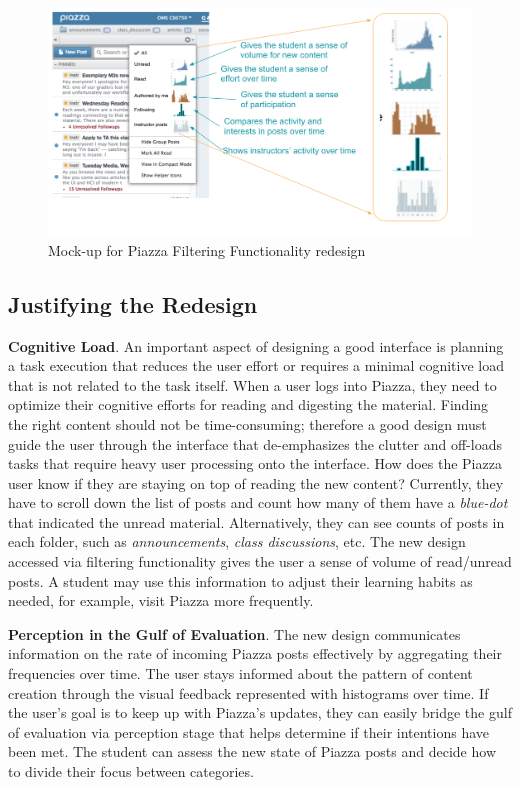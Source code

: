 \documentclass[12pt,letterpaper]{article}
\begin{document}
\begin{figure}[h]
\centering
\includegraphics[scale=.5]{figures/p5/piazza_filtering.png}
\caption{Mock-up for Piazza Filtering Functionality redesign}
\label{fig::1}
\end{figure}

\subsection*{Justifying the Redesign}

\textbf{Cognitive Load}. An important aspect of designing a good interface is planning a task execution that reduces the user effort or requires a minimal cognitive load that is not related to the task itself. When a user logs into Piazza, they need to optimize their cognitive efforts for reading and digesting the material. Finding the right content should not be time-consuming; therefore a good design must guide the user through the interface that de-emphasizes the clutter and off-loads tasks that require heavy user processing onto the interface. How does the Piazza user know if they are staying on top of reading the new content? Currently, they have to scroll down the list of posts and count how many of them have a \textit{blue-dot} that indicated the unread material. Alternatively, they can see counts of posts in each folder, such as \textit{announcements}, \textit{class discussions}, etc. The new design accessed via filtering functionality gives the user a sense of volume of read/unread posts. A student may use this information to adjust their learning habits as needed, for example, visit Piazza more frequently.     

\textbf{Perception in the Gulf of Evaluation}. The new design communicates information on the rate of incoming Piazza posts effectively by aggregating their frequencies over time. The user stays informed about the pattern of content creation through the visual feedback represented with histograms over time. If the user's goal is to keep up with Piazza's updates, they can easily bridge the gulf of evaluation via perception stage that helps determine if their intentions have been met. The student can assess the new state of Piazza posts and decide how to divide their focus between categories.
\end{document}
